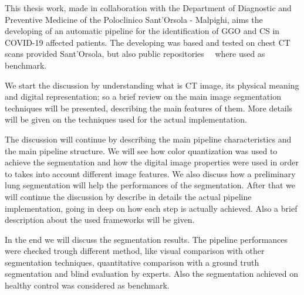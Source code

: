 \documentclass{standalone}
\begin{document}
This thesis work, made in collaboration with the Department of Diagnostic and Preventive Medicine of the Poloclinico Sant'Orsola - Malpighi, aims the developing of an automatic pipeline for the identification of GGO and CS in COVID-19 affected patients. The developing was based and tested on chest CT scans provided Sant'Orsola, but also public repositories~\cite{DATA:ZENODO}~\cite{DATA:MOSMED} where used as benchmark.

We start the discussion by understanding what is CT image, its physical meaning and digital representation; so a brief review on the main image segmentation techniques will be presented, describing the main features of them. More details will be given on the techniques used for the actual implementation.

The discussion will continue by describing the main pipeline characteristics and the main pipeline structure. We will see how color quantization was used to achieve the segmentation and how the digital image properties were used in order to takes into account different image features. We also discuss how a preliminary lung segmentation will help the performances of the segmentation. After that we will continue the discussion by describe in details the actual pipeline implementation, going in deep on how each step is actually achieved. Also a brief description about the used frameworks will be given.

In the end we will discuss the segmentation results. The pipeline performances were checked trough different method, like visual comparison with other segmentation techniques, quantitative comparison with a ground truth segmentation and blind evaluation by experts. Also the segmentation achieved on healthy control was considered as benchmark.
\end{document}
